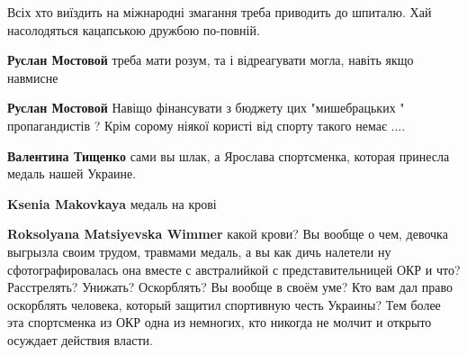 \begin{itemize}
\begin{itemize}
\begin{itemize}
Всіх хто виїздить на міжнародні змагання треба приводить до шпиталю. Хай
насолодяться кацапською дружбою по-повній.

 
\textbf{Руслан Мостовой} треба мати розум, та і відреагувати могла, навіть якщо навмисне

 
\textbf{Руслан Мостовой} Навіщо фінансувати з бюджету цих "мишебрацьких " пропагандистів ? Крім сорому ніякої користі від спорту такого немає ....
\end{itemize}

 
\textbf{Валентина Тищенко} сами вы шлак, а Ярослава спортсменка, которая принесла медаль нашей Украине.

\begin{itemize}
 
\textbf{Ksenia Makovkaya} медаль на крові

 
\textbf{Roksolyana Matsiyevska Wimmer} какой крови? Вы вообще о чем, девочка
выгрызла своим трудом, травмами медаль, а вы как дичь налетели ну
сфотографировалась она вместе с австралийкой с представительницей ОКР и что?
Расстрелять? Унижать? Оскорблять? Вы вообще в своём уме? Кто вам дал право
оскорблять человека, который защитил спортивную честь Украины? Тем более эта
спортсменка из ОКР одна из немногих, кто никогда не молчит и открыто осуждает
действия власти.


\end{itemize}
\end{itemize}
\end{itemize}
